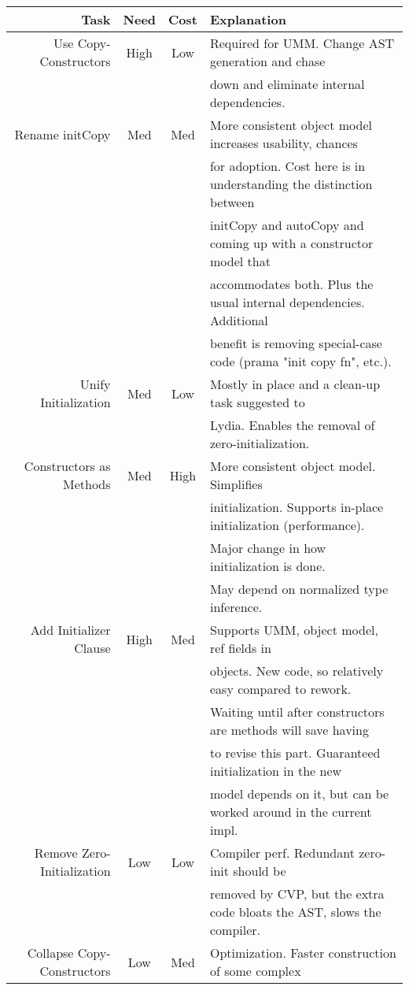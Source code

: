 \begin{tabular}{|r|c|c|l|}
\hline
Task & Need & Cost & Explanation \\ \hline\hline
Use Copy-Constructors & High & Low & Required for UMM. Change AST generation and chase \\
 & & & down and eliminate internal dependencies. \\ \hline
Rename initCopy & Med & Med & More consistent object model increases usability, chances \\
 & & & for adoption.  Cost here is in understanding the distinction between \\
 & & & initCopy and autoCopy and coming up with a constructor model that \\
 & & & accommodates both.  Plus the usual internal dependencies.  Additional\\
 & & & benefit is removing special-case code (prama "init copy fn", etc.). \\ \hline
Unify Initialization & Med & Low & Mostly in place and a clean-up task suggested to \\
 & & & Lydia.  Enables the removal of zero-initialization. \\ \hline
Constructors as Methods & Med & High & More consistent object model. Simplifies \\
 & & & initialization. Supports in-place initialization (performance). \\
 & & & Major change in how initialization is done. \\
 & & & May depend on normalized type inference. \\ \hline
Add Initializer Clause & High & Med & Supports UMM, object model, ref fields in \\
 & & & objects. New code, so relatively easy compared to rework. \\
 & & & Waiting until after constructors are methods will save having \\
 & & & to revise this part. Guaranteed initialization in the new \\
 & & & model depends on it, but can be worked around in the current impl. \\ \hline
Remove Zero-Initialization & Low & Low & Compiler perf. Redundant zero-init should be \\
 & & & removed by CVP, but the extra code bloats the AST, slows the compiler. \\ \hline
Collapse Copy-Constructors & Low & Med & Optimization. Faster construction of some complex \\

\end{tabular}
